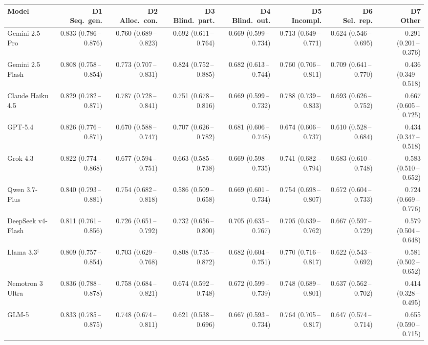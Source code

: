 \begin{tabular}{lrrrrrrr}
\toprule
Model & \makecell{D1\\Seq.\ gen.} & \makecell{D2\\Alloc.\ con.} & \makecell{D3\\Blind.\ part.} & \makecell{D4\\Blind.\ out.} & \makecell{D5\\Incompl.} & \makecell{D6\\Sel.\ rep.} & \makecell{D7\\Other} \\
\midrule
Gemini 2.5 Pro & 0.833 (0.786\,--\,0.876) & 0.760 (0.689\,--\,0.823) & 0.692 (0.611\,--\,0.764) & 0.669 (0.599\,--\,0.734) & 0.713 (0.649\,--\,0.771) & 0.624 (0.546\,--\,0.695) & 0.291 (0.201\,--\,0.376) \\
Gemini 2.5 Flash & 0.808 (0.758\,--\,0.854) & 0.773 (0.707\,--\,0.831) & 0.824 (0.752\,--\,0.885) & 0.682 (0.613\,--\,0.744) & 0.760 (0.706\,--\,0.811) & 0.709 (0.641\,--\,0.770) & 0.436 (0.349\,--\,0.518) \\
Claude Haiku 4.5 & 0.829 (0.782\,--\,0.871) & 0.787 (0.728\,--\,0.841) & 0.751 (0.678\,--\,0.816) & 0.669 (0.599\,--\,0.732) & 0.788 (0.739\,--\,0.833) & 0.693 (0.626\,--\,0.752) & 0.667 (0.605\,--\,0.725) \\
GPT-5.4 & 0.826 (0.776\,--\,0.871) & 0.670 (0.588\,--\,0.747) & 0.707 (0.626\,--\,0.782) & 0.681 (0.606\,--\,0.748) & 0.674 (0.606\,--\,0.737) & 0.610 (0.528\,--\,0.684) & 0.434 (0.347\,--\,0.518) \\
Grok 4.3 & 0.822 (0.774\,--\,0.868) & 0.677 (0.594\,--\,0.751) & 0.663 (0.585\,--\,0.738) & 0.669 (0.598\,--\,0.735) & 0.741 (0.682\,--\,0.794) & 0.683 (0.610\,--\,0.748) & 0.583 (0.510\,--\,0.652) \\
Qwen 3.7-Plus & 0.840 (0.793\,--\,0.881) & 0.754 (0.682\,--\,0.818) & 0.586 (0.509\,--\,0.658) & 0.669 (0.601\,--\,0.734) & 0.754 (0.698\,--\,0.807) & 0.672 (0.604\,--\,0.733) & 0.724 (0.669\,--\,0.776) \\
DeepSeek v4-Flash & 0.811 (0.761\,--\,0.856) & 0.726 (0.651\,--\,0.792) & 0.732 (0.656\,--\,0.800) & 0.705 (0.635\,--\,0.767) & 0.705 (0.639\,--\,0.762) & 0.667 (0.597\,--\,0.729) & 0.579 (0.504\,--\,0.648) \\
Llama 3.3$^\dagger$ & 0.809 (0.757\,--\,0.854) & 0.703 (0.629\,--\,0.768) & 0.808 (0.735\,--\,0.872) & 0.682 (0.604\,--\,0.751) & 0.770 (0.716\,--\,0.817) & 0.622 (0.543\,--\,0.692) & 0.581 (0.502\,--\,0.652) \\
Nemotron 3 Ultra & 0.836 (0.788\,--\,0.878) & 0.758 (0.684\,--\,0.821) & 0.674 (0.592\,--\,0.748) & 0.672 (0.599\,--\,0.739) & 0.748 (0.689\,--\,0.801) & 0.637 (0.562\,--\,0.702) & 0.414 (0.328\,--\,0.495) \\
GLM-5 & 0.833 (0.785\,--\,0.875) & 0.748 (0.674\,--\,0.811) & 0.621 (0.538\,--\,0.696) & 0.667 (0.593\,--\,0.734) & 0.764 (0.705\,--\,0.817) & 0.647 (0.574\,--\,0.714) & 0.655 (0.590\,--\,0.715) \\
\bottomrule
\end{tabular}